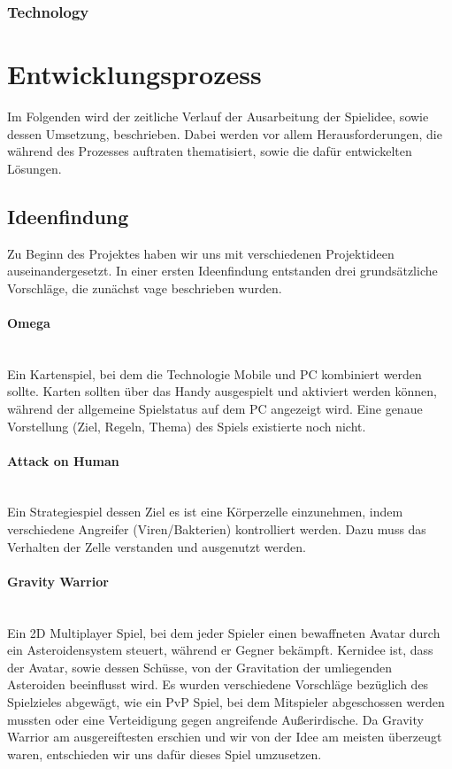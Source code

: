 \documentclass[11pt]{scrartcl}
\newcommand{\lbparagraph}[1]{\paragraph*{#1}\mbox{}\\}
\begin{document}
\subsubsection{Technology}
\label{subsec:tech}

\newpage
\section{Entwicklungsprozess}
Im Folgenden wird der zeitliche Verlauf der Ausarbeitung der Spielidee, sowie dessen Umsetzung, beschrieben. Dabei werden vor allem Herausforderungen, die während des Prozesses auftraten thematisiert, sowie die dafür entwickelten Lösungen.
\subsection{Ideenfindung}
Zu Beginn des Projektes haben wir uns mit verschiedenen Projektideen auseinandergesetzt. In einer ersten Ideenfindung entstanden drei grundsätzliche Vorschläge, die zunächst vage beschrieben wurden.

\lbparagraph{Omega}
Ein Kartenspiel, bei dem die Technologie Mobile und PC kombiniert werden sollte. Karten sollten über das Handy ausgespielt und aktiviert werden können, während der allgemeine Spielstatus auf dem PC angezeigt wird. Eine genaue Vorstellung (Ziel, Regeln, Thema) des Spiels existierte noch nicht.
\lbparagraph{Attack on Human}
Ein Strategiespiel dessen Ziel es ist eine Körperzelle einzunehmen, indem verschiedene Angreifer (Viren/Bakterien) kontrolliert werden. Dazu muss das Verhalten der Zelle verstanden und ausgenutzt werden.

\lbparagraph{Gravity Warrior}
Ein 2D Multiplayer Spiel, bei dem jeder Spieler einen bewaffneten Avatar durch ein Asteroidensystem steuert, während er Gegner bekämpft. Kernidee ist, dass der Avatar, sowie dessen Schüsse, von der Gravitation der umliegenden Asteroiden beeinflusst wird.
Es wurden verschiedene Vorschläge bezüglich des Spielzieles abgewägt, wie ein PvP Spiel, bei dem Mitspieler abgeschossen werden mussten oder eine Verteidigung gegen angreifende Außerirdische. Da Gravity Warrior am ausgereiftesten erschien und wir von der Idee am meisten überzeugt waren, entschieden wir uns dafür dieses Spiel umzusetzen.
\end{document}
